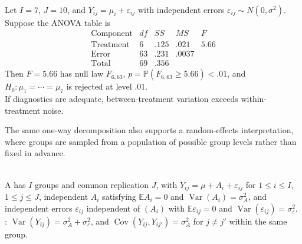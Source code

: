 \begin{example} \label{ex:tablet-laboratories-one-way-anova} \\
Let $I=7$, $J=10$, and $Y_{ij}=\mu_i+\varepsilon_{ij}$ with independent errors $\varepsilon_{ij}\sim N(0,\sigma^2)$. Suppose the ANOVA table is
\[
\begin{array}{c|rrrr}
\text{Component} & df & SS & MS & F\\ \hline
\text{Treatment} & 6 & .125 & .021 & 5.66\\
\text{Error} & 63 & .231 & .0037 & \\
\text{Total} & 69 & .356 & &
\end{array}
\]
Then $F=5.66$ has null law $F_{6,63}$, $p=\mathbb{P}(F_{6,63}\geq5.66)<.01$, and $H_0:\mu_1=\cdots=\mu_7$ is rejected at level $.01$.\\
If diagnostics are adequate, between-treatment variation exceeds within-treatment noise.
\end{example}

The same one-way decomposition also supports a random-effects interpretation, where groups are sampled from a population of possible group levels rather than fixed in advance.

\begin{definition} \label{def:one-way-random-effects-model} \\
A  has $I$ groups and common replication $J$, with $Y_{ij}=\mu+A_i+\varepsilon_{ij}$ for $1\leq i\leq I$, $1\leq j\leq J$, independent $A_i$ satisfying $\mathbb{E}A_i=0$ and $\operatorname{Var}(A_i)=\sigma_A^2$, and independent errors $\varepsilon_{ij}$ independent of $(A_i)$ with $\mathbb{E}\varepsilon_{ij}=0$ and $\operatorname{Var}(\varepsilon_{ij})=\sigma_\varepsilon^2$.\\
: $\operatorname{Var}(Y_{ij})=\sigma_A^2+\sigma_\varepsilon^2$, and $\operatorname{Cov}(Y_{ij},Y_{ij'})=\sigma_A^2$ for $j\ne j'$ within the same group.
\end{definition}

